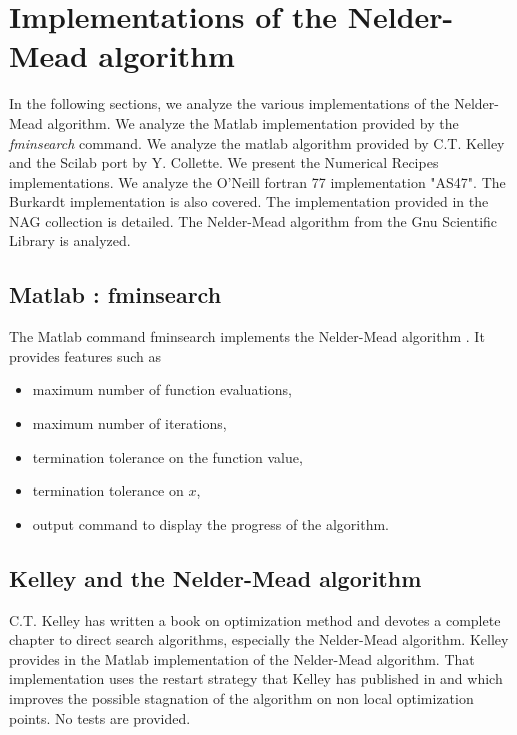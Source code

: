 \chapter{Implementations of the Nelder-Mead algorithm}

In the following sections, we analyze the various implementations of the 
Nelder-Mead algorithm. We analyze the Matlab implementation provided 
by the \emph{fminsearch} command. We analyze the matlab algorithm provided by 
C.T. Kelley and the Scilab port by Y. Collette. We 
present the Numerical Recipes implementations. We analyze the O'Neill 
fortran 77 implementation "AS47". The Burkardt implementation is also covered.
The implementation provided in the NAG collection is detailed.
The Nelder-Mead algorithm from the Gnu Scientific Library is analyzed.

\section{Matlab : fminsearch}

The Matlab command fminsearch implements the Nelder-Mead algorithm \cite{MatlabFminsearch}. 
It provides features such as 
\begin{itemize}
\item maximum number of function evaluations,
\item maximum number of iterations,
\item termination tolerance on the function value,
\item termination tolerance on $x$,
\item output command to display the progress of the algorithm.
\end{itemize}

\section{Kelley and the Nelder-Mead algorithm}

C.T. Kelley has written a book \cite{Kelley1999} on optimization method and devotes a 
complete chapter to direct search algorithms, especially the Nelder-Mead 
algorithm. Kelley provides in \cite{KelleyMethodsOptimizationMatlabCodes} 
the Matlab implementation of the 
Nelder-Mead algorithm. That implementation uses the restart strategy 
that Kelley has published in \cite{589283} and which improves the possible 
stagnation of the algorithm on non local optimization points. No tests 
are provided.


